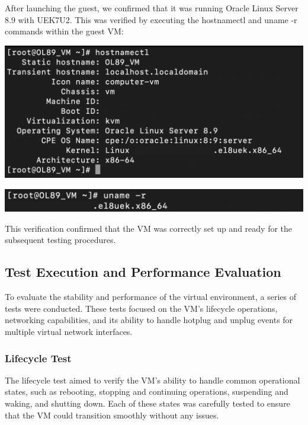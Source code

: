 After launching the guest, we confirmed that it was running Oracle Linux Server 8.9 with UEK7U2. This was verified by executing the hostnamectl and uname -r commands within the guest VM:

\begin{center}
    \centering
    \includegraphics[width=\textwidth]{Images/Hostnamectl Command on the Guest.png}
    \label{fig:casa}
\end{center}

\begin{center}
    \centering
    \includegraphics[width=\textwidth]{Images/Uname -r Command on the Guest.png}
    \label{fig:casa}
\end{center}

This verification confirmed that the VM was correctly set up and ready for the subsequent testing procedures.


\subsection{Test Execution and Performance Evaluation}
To evaluate the stability and performance of the virtual environment, a series of tests were conducted. These tests focused on the VM's lifecycle operations, networking capabilities, and its ability to handle hotplug and unplug events for multiple virtual network interfaces.

\subsubsection[Lifecycle Test]{Lifecycle Test}
The lifecycle test aimed to verify the VM's ability to handle common operational states, such as rebooting, stopping and continuing operations, suspending and waking, and shutting down. Each of these states was carefully tested to ensure that the VM could transition smoothly without any issues.

